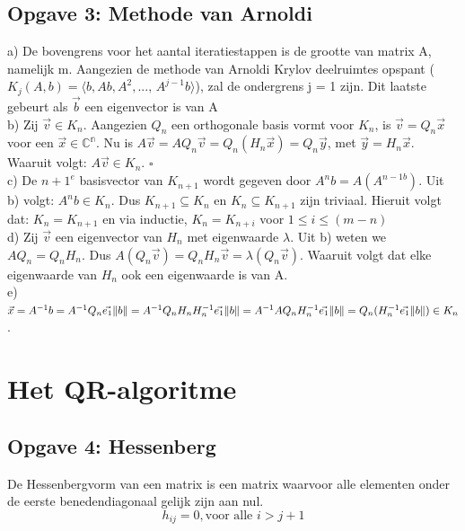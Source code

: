 \documentclass[a4paper]{article}
\newcommand*{\qed}{\hfill\ensuremath{\square}}
\newcommand{\opgave}[1]{\subsection{Opgave #1}}
\begin{document}
\opgave{3: Methode van Arnoldi}\label{sec:oef3}
a)  De bovengrens voor het aantal iteratiestappen is de grootte van matrix A, namelijk m. Aangezien de methode van Arnoldi Krylov deelruimtes opspant ($K_j(A,b) = \langle b, Ab, A^2,\text{..., }A^{j-1}b \rangle $), zal de ondergrens j = 1 zijn. Dit laatste gebeurt als $\vec{b}$ een eigenvector is van A\\
\newline
b)  Zij $\vec{v} \in K_n$. Aangezien $Q_n$ een orthogonale basis vormt voor $K_n$, is $\vec{v} = Q_n\vec{x}$ voor een $\vec{x} \in \mathbb{C^{\text{n}}}$. Nu is $A \vec{v} = AQ_n\vec{v} = Q_n(H_n\vec{x}) = Q_n\vec{y}$, met $\vec{y} = H_n\vec{x} $.  Waaruit volgt: $A\vec{v} \in K_n$. \qed\\
\newline
c) De $n+1^e$ basisvector van $K_{n+1}$ wordt gegeven door $ A^nb = A(A^{n-1b}) $. Uit b) volgt: $A^nb \in K_n$. Dus $K_{n+1} \subseteq K_n$ en $K_{n} \subseteq K_{n+1}$ zijn triviaal. Hieruit volgt dat: $K_n = K_{n+1}$ en via inductie, $K_n = K_{n+i}$ voor $1 \leq i \leq (m-n)$\\
\newline
d) Zij $\vec{v}$ een eigenvector van $H_n$ met eigenwaarde $\lambda$. Uit b) weten we $AQ_n = Q_nH_n$. Dus $A(Q_n\vec{v}) = Q_nH_n\vec{v} = \lambda(Q_n\vec{v})$. Waaruit volgt dat elke eigenwaarde van $H_n$ ook een eigenwaarde is van A.\\
\newline
e) $\vec{x} = A^{-1}b = A^{-1}Q_n\vec{e_1}\norm{b} = A^{-1}Q_nH_nH_n^{-1}\vec{e_1}\norm{b} = A^{-1}AQ_nH_n^{-1}\vec{e_1}\norm{b} = Q_n(H_n^{-1}\vec{e_1}\norm{b}) \in K_n$.

\section{Het QR-algoritme}\label{sec:QR}

\opgave{4: Hessenberg}\label{sec:oef4}

De Hessenbergvorm van een matrix is een matrix waarvoor alle elementen onder de eerste benedendiagonaal gelijk zijn aan nul.
\begin{equation}\nonumber
	h_{ij} =0 , \text{voor alle } i > j+1
\end{equation}
\end{document}
